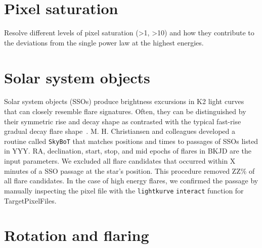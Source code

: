 \documentclass{aa}
\begin{document}
\begin{appendix}
\section{Pixel saturation}
Resolve different levels of pixel saturation (>1, >10) and how they contribute to the deviations from the single power law at the highest energies.
\section{Solar system objects}
Solar system objects (SSOs) produce brightness excursions in K2 light curves that can closely resemble flare signatures. Often, they can be distinguished by their symmetric rise and decay shape as contrasted with the typical fast-rise gradual decay flare shape~\citep{davenport_kepler_2014}.
M. H. Christiansen and colleagues developed a routine called \texttt{SkyBoT} that matches positions and times to passages of SSOs listed in YYY. RA, declination, start, stop, and mid epochs of flares in BKJD are the input parameters. We excluded all flare candidates that occurred within X minutes of a SSO passage at the star's position. This procedure removed ZZ\% of all flare candidates. In the case of high energy flares, we confirmed the passage by manually inspecting the pixel file with the \texttt{lightkurve} \texttt{interact} function for TargetPixelFiles.
\section{Rotation and flaring}



\end{appendix}
\end{document}
